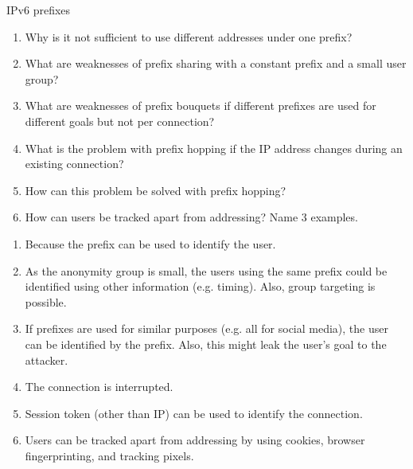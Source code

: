 \documentclass{article}
\begin{document}
\begin{exercise}{IPv6 prefixes}
  \begin{enumerate}
    \item Why is it not sufficient to use different addresses under one prefix?
    \item What are weaknesses of prefix sharing with a constant prefix and a small user group?
    \item What are weaknesses of prefix bouquets if different prefixes are used for different goals but not per connection?
    \item What is the problem with prefix hopping if the IP address changes during an existing connection?
    \item How can this problem be solved with prefix hopping?
    \item How can users be tracked apart from addressing? Name 3 examples.
  \end{enumerate}

  \begin{solution}
    \begin{enumerate}
      \item Because the prefix can be used to identify the user.
      \item As the anonymity group is small, the users using the same prefix could be identified using other information (e.g. timing). Also, group targeting is possible.
      \item If prefixes are used for similar purposes (e.g. all for social media), the user can be identified by the prefix. Also, this might leak the user's goal to the attacker.
      \item The connection is interrupted.
      \item Session token (other than IP) can be used to identify the connection. 
      \item Users can be tracked apart from addressing by using cookies, browser fingerprinting, and tracking pixels.
    \end{enumerate}
  \end{solution}
\end{exercise}
\end{document}
